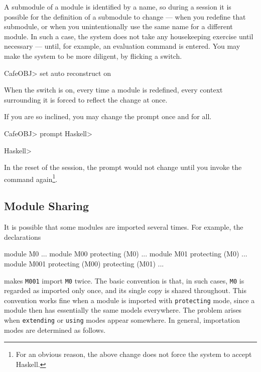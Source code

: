 \documentclass[a4paper]{memoir}
\begin{document}
A submodule of a module is identified by a name, so during a session
it is possible for the definition of a submodule to
change --- when you redefine that submodule, or when you unintentionally
use the same name for a different module. In such a case, the system
does not take any housekeeping exercise until necessary --- until,
for example, an evaluation command is entered. You may make the
system to be more diligent, by flicking a switch.
\begin{vvtm}
\begin{ccode}
  CafeOBJ> set auto reconstruct on
\end{ccode}
\end{vvtm}
When the switch is on, every time a module is redefined, every
context surrounding it is forced to reflect the change at once.

If you are so inclined, you may change the prompt once and for all.
\begin{vvtm}
\begin{ccode}
  CafeOBJ> prompt Haskell>

  Haskell>
\end{ccode}
\end{vvtm}
In the reset of the session, the prompt would not change until
you invoke the command again\footnote{For an obvious reason, the above change
does not force the system to accept Haskell.}.

\subsection{Module Sharing}\label{sec:p2-module-sharing}

It is possible that some modules are imported several times.
For example, the declarations
\begin{vvtm}
\begin{ccode}
  module M0 { ... }
  module M00 { protecting (M0) ... }
  module M01 { protecting (M0) ... }
  module M001 { protecting (M00) protecting (M01) ... }
\end{ccode}
\end{vvtm}
makes \verb|M001| import \verb|M0| twice. The basic
convention is that, in such cases, \verb|M0|
is regarded as imported only once, and its single copy is
shared throughout. This convention works fine when a module is
imported with \verb|protecting| mode, since a module then has
essentially the same models everywhere. The problem arises
when \verb|extending| or \verb|using| modes appear somewhere.
In general, importation modes are determined as follows.
\end{document}
